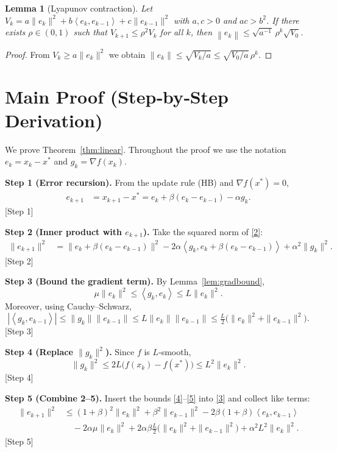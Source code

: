 \documentclass[11pt]{article}
\newtheorem{lemma}{Lemma}
\newcommand{\norm}[1]{\left\lVert#1\right\rVert}
\newcommand{\ip}[2]{\left\langle #1,#2\right\rangle}
\newcommand{\grad}{\nabla}
\begin{document}
\begin{lemma}[Lyapunov contraction]\label{lem:lyap}
Let $V_{k}=a\|e_{k}\|^{2}+b\ip{e_{k}}{e_{k-1}}+c\|e_{k-1}\|^{2}$ with
$a,c>0$ and $ac>b^{2}$. If there exists $\rho\in(0,1)$ such that
$V_{k+1}\le\rho^{2}V_{k}$ for all $k$, then $\norm{e_{k}}\le\sqrt{a^{-1}}\,\rho^{k}
\sqrt{V_{0}}$.
\end{lemma}
\begin{proof}
From $V_{k}\ge a\|e_{k}\|^{2}$ we obtain
$\|e_{k}\|\le\sqrt{V_{k}/a}\le\sqrt{V_{0}/a}\,\rho^{k}$.
\end{proof}

\section*{Main Proof (Step‑by‑Step Derivation)}
We prove Theorem~\ref{thm:linear}. Throughout the proof we use the
notation $e_{k}=x_{k}-x^{*}$ and $g_{k}=\grad f(x_{k})$.

\bigskip
\noindent\textbf{Step 1 (Error recursion).}  
From the update rule (HB) and $\grad f(x^{*})=0$,
\begin{align}
e_{k+1}
&=x_{k+1}-x^{*}
 =e_{k}+\beta(e_{k}-e_{k-1})-\alpha g_{k}. \tag{2}
\end{align}
[Step 1]

\noindent\textbf{Step 2 (Inner product with $e_{k+1}$).}  
Take the squared norm of \eqref{2}:
\begin{align}
\|e_{k+1}\|^{2}
&=\|e_{k}+\beta(e_{k}-e_{k-1})\|^{2}
   -2\alpha\ip{g_{k}}{e_{k}+\beta(e_{k}-e_{k-1})}
   +\alpha^{2}\|g_{k}\|^{2}. \tag{3}
\end{align}
[Step 2]

\noindent\textbf{Step 3 (Bound the gradient term).}  
By Lemma~\ref{lem:gradbound},
\[
\mu\|e_{k}\|^{2}\le\ip{g_{k}}{e_{k}}\le L\|e_{k}\|^{2}.
\]
Moreover, using Cauchy–Schwarz,
\[
|\ip{g_{k}}{e_{k-1}}|
\le \|g_{k}\|\|e_{k-1}\|
\le L\|e_{k}\|\|e_{k-1}\|
\le \tfrac{L}{2}\bigl(\|e_{k}\|^{2}+\|e_{k-1}\|^{2}\bigr). \tag{4}
\]
[Step 3]

\noindent\textbf{Step 4 (Replace $\|g_{k}\|^{2}$).}  
Since $f$ is $L$‑smooth,
\[
\|g_{k}\|^{2}\le 2L\bigl(f(x_{k})-f(x^{*})\bigr)
\le L^{2}\|e_{k}\|^{2}. \tag{5}
\]
[Step 4]

\noindent\textbf{Step 5 (Combine 2–5).}  
Insert the bounds \eqref{4}–\eqref{5} into \eqref{3} and collect like
terms:
\begin{align}
\|e_{k+1}\|^{2}
&\le (1+\beta)^{2}\|e_{k}\|^{2}
   +\beta^{2}\|e_{k-1}\|^{2}
   -2\beta(1+\beta)\ip{e_{k}}{e_{k-1}}   \nonumber\\
&\quad -2\alpha\mu\|e_{k}\|^{2}
   +2\alpha\beta\frac{L}{2}\bigl(\|e_{k}\|^{2}+\|e_{k-1}\|^{2}\bigr)
   +\alpha^{2}L^{2}\|e_{k}\|^{2}. \tag{6}
\end{align}
[Step 5]
\end{document}
